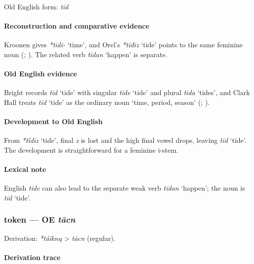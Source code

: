 \documentclass[
  british,
  a4paper,
]{article}
\providecommand{\Recon}[1]{\emph{*#1}}
\begin{document}
Old English form: \emph{tīd}

\paragraph{Reconstruction and comparative
evidence}\label{reconstruction-and-comparative-evidence-61}

Kroonen gives \emph{*tīdi-} `time', and Orel's \Recon{tīđiz} `tide'
points to the same feminine noun (; ). The related verb
\emph{tīdan} `happen' is separate.

\paragraph{Old English evidence}\label{old-english-evidence-61}

Bright records \emph{tīd} `tide' with singular \emph{tīde} `tide' and
plural \emph{tīda} `tides', and Clark Hall treats \emph{tīd} `tide' as
the ordinary noun `time, period, season'
(;
).

\paragraph{Development to Old
English}\label{development-to-old-english-61}

From \Recon{tī́diz} `tide', final \emph{z} is lost and the high final
vowel drops, leaving \emph{tīd} `tide'. The development is
straightforward for a feminine i-stem.

\paragraph{Lexical note}\label{lexical-note-1}

English \emph{tide} can also lead to the separate weak verb \emph{tīdan}
`happen'; the noun is \emph{tīd} `tide'.

\subsubsection{\texorpdfstring{token --- OE
\emph{tācn}}{token --- OE tācn}}\label{token-oe-tux101cn}

Derivation: \emph{*táikną} \textgreater{} \emph{tācn} (regular).

\paragraph{Derivation trace}\label{derivation-trace-66}
\end{document}

